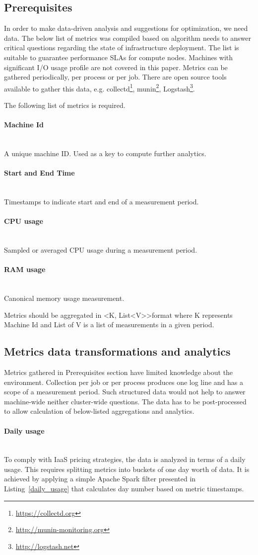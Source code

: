 \documentclass[]{final_report}
\newcommand{\myparagraph}[1]{\paragraph{#1}\mbox{}\\}
\begin{document}
\subsection{Prerequisites} 

In order to make data-driven analysis and suggestions for optimization, we need data. The below list of metrics was compiled based on algorithm needs to answer critical questions regarding the state of infrastructure deployment. The list is suitable to guarantee performance SLAs for compute nodes. Machines with significant I/O usage profile are not covered in this paper. 
Metrics can be gathered periodically, per process or per job. There are open source tools available to gather this data, e.g. collectd\footnote{\url{https://collectd.org}}, munin\footnote{\url{http://munin-monitoring.org}}, Logstash\footnote{\url{http://logstash.net}}.

The following list of metrics is required.
\myparagraph{Machine Id}
A unique machine ID. Used as a key to compute further analytics.

\myparagraph{Start and End Time}
Timestamps to indicate start and end of a measurement period.

\myparagraph{CPU usage}
Sampled or averaged CPU usage during a measurement period. 

\myparagraph{RAM usage}
Canonical memory usage measurement. 

Metrics should be aggregated in \textless K, List\textless V\textgreater\textgreater format where K represents Machine Id and List of V is a list of measurements in a given period. 

\subsection{Metrics data transformations and analytics}

Metrics gathered in Prerequisites section have limited knowledge about the environment. Collection per job or per process produces one log line and has a scope of a measurement period. Such structured data would not help to answer machine-wide neither cluster-wide questions. The data has to be post-processed to allow calculation of below-listed aggregations and analytics.   

\myparagraph{Daily usage}

To comply with IaaS pricing strategies, the data is analyzed in terms of a daily usage. This requires splitting metrics into buckets of one day worth of data. 
It is achieved by applying a simple Apache Spark filter presented in Listing~\ref{daily_usage} that calculates day number based on metric timestamps.
\end{document}
